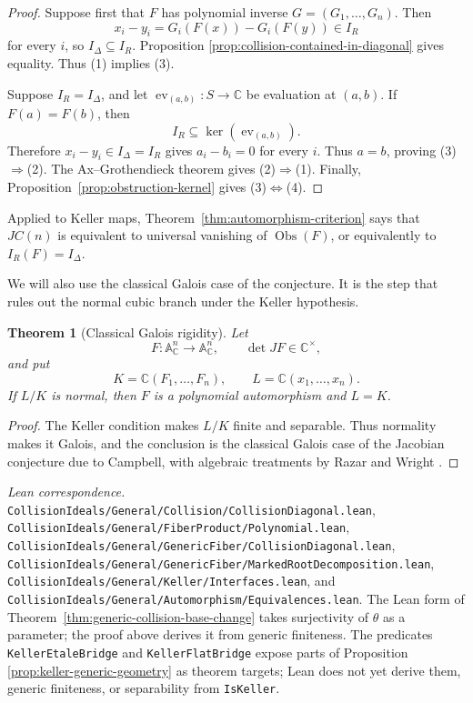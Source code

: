 \documentclass[11pt]{article}
\newtheorem{theorem}{Theorem}[section]
\theoremstyle{remark}
\theoremstyle{definition}
\newcommand{\A}{\mathbb A}
\newcommand{\C}{\mathbb C}
\newcommand{\Obs}{\operatorname{Obs}}
\newcommand{\leanpath}[1]{\texttt{\nolinkurl{#1}}}
\newenvironment{leanfiles}
  {\par\medskip\begingroup\footnotesize\raggedright\noindent
   \textit{Lean correspondence.}\ }
  {\par\endgroup\medskip}
\begin{document}
\begin{proof}
Suppose first that \(F\) has polynomial inverse
\(G=(G_1,\dots,G_n)\).  Then
\[
  x_i-y_i
  =
  G_i(F(x))-G_i(F(y))
  \in I_R
\]
for every \(i\), so \(I_\Delta\subseteq I_R\).  Proposition
\ref{prop:collision-contained-in-diagonal} gives equality.  Thus
\textup{(1)} implies \textup{(3)}.

Suppose \(I_R=I_\Delta\), and let
\(\operatorname{ev}_{(a,b)}\colon S\to\C\) be evaluation at
\((a,b)\).  If \(F(a)=F(b)\), then
\[
  I_R\subseteq\ker(\operatorname{ev}_{(a,b)}).
\]
Therefore \(x_i-y_i\in I_\Delta=I_R\) gives \(a_i-b_i=0\) for every
\(i\).  Thus \(a=b\), proving
\textup{(3)}\(\Rightarrow\)\textup{(2)}.  The
Ax--Grothendieck theorem \cite{Ax1969} gives
\textup{(2)}\(\Rightarrow\)\textup{(1)}.  Finally,
Proposition~\ref{prop:obstruction-kernel} gives
\textup{(3)}\(\Longleftrightarrow\)\textup{(4)}.
\end{proof}

Applied to Keller maps, Theorem~\ref{thm:automorphism-criterion} says
that \(JC(n)\) is equivalent to universal vanishing of \(\Obs(F)\), or
equivalently to \(I_R(F)=I_\Delta\).

We will also use the classical Galois case of the conjecture.  It is the
step that rules out the normal cubic branch under the Keller hypothesis.

\begin{theorem}[Classical Galois rigidity]
\label{thm:classical-galois-rigidity}
Let
\[
  F\colon\A^n_{\C}\longrightarrow\A^n_{\C},
  \qquad \det JF\in\C^\times,
\]
and put
\[
  K=\C(F_1,\dots,F_n),
  \qquad
  L=\C(x_1,\dots,x_n).
\]
If \(L/K\) is normal, then \(F\) is a polynomial automorphism and
\(L=K\).
\end{theorem}

\begin{proof}
The Keller condition makes \(L/K\) finite and separable.  Thus normality
makes it Galois, and the conclusion is the classical Galois case of the
Jacobian conjecture due to Campbell, with algebraic treatments by Razar
and Wright \cite{Campbell1973,Razar1979,Wright1981}.
\end{proof}

\begin{leanfiles}
\leanpath{CollisionIdeals/General/Collision/CollisionDiagonal.lean},
\leanpath{CollisionIdeals/General/FiberProduct/Polynomial.lean},
\leanpath{CollisionIdeals/General/GenericFiber/CollisionDiagonal.lean},
\leanpath{CollisionIdeals/General/GenericFiber/MarkedRootDecomposition.lean},
\leanpath{CollisionIdeals/General/Keller/Interfaces.lean}, and
\leanpath{CollisionIdeals/General/Automorphism/Equivalences.lean}.  The Lean form of
Theorem~\ref{thm:generic-collision-base-change} takes surjectivity of
\(\theta\) as a parameter; the proof above derives it from generic
finiteness.  The predicates \leanpath{KellerEtaleBridge} and
\leanpath{KellerFlatBridge} expose parts of Proposition
\ref{prop:keller-generic-geometry} as theorem targets; Lean does not yet
derive them, generic finiteness, or separability from \leanpath{IsKeller}.
\end{leanfiles}
\end{document}
